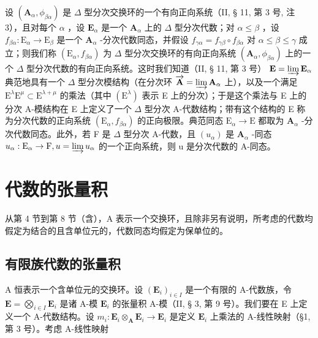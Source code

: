 设 \((\mathbf{A}_{\alpha},\phi_{\beta \alpha})\) 是 \(\Delta\) 型分次交换环的一个有向正向系统（II, § 11, 第 3 号, 注 3），且对每个 \(\alpha\) ，设 \(\mathbf{E}_{\alpha}\) 是一个 \(\mathbf{A}_{\alpha}\) 上的 \(\Delta\) 型分次代数；对 \(\alpha \leqslant \beta\) ，设 \(f_{\beta \alpha}:\mathrm{E}_{\alpha}\to \mathrm{E}_{\beta}\) 是一个 \(\mathbf{A}_{\alpha}\) -分次代数同态，并假设 \(f_{\gamma \alpha} = f_{\gamma \beta}\circ f_{\beta \alpha}\) 对 \(\alpha \leqslant \beta \leqslant \gamma\) 成立；则我们称 \((\mathrm{E}_{\alpha},f_{\beta \alpha})\) 为 \(\Delta\) 型分次交换环的有向正向系统 \((\mathbf{A}_{\alpha},\phi_{\beta \alpha})\) 上的一个 \(\Delta\) 型分次代数的有向正向系统。这时我们知道（II, § 11, 第 3 号） \(\mathbf{E} = \varinjlim \mathbf{E}_{\alpha}\) 典范地具有一个 \(\Delta\) 型分次模结构（在分次环 \(\overrightarrow{\mathbf{A}} = \varinjlim \mathbf{A}_{\alpha}\) 上），以及一个满足 \(\mathrm{E}^{\lambda}\mathrm{E}^{\mu}\subset \mathrm{E}^{\lambda +\mu}\) 的乘法（其中 \((\mathrm{E}^{\lambda})\) 表示 E 上的分次）；于是这个乘法与 E 上的分次 A-模结构在 E 上定义了一个 \(\Delta\) 型分次 A-代数结构；带有这个结构的 E 称为分次代数的正向系统 \((\mathrm{E}_{\alpha},f_{\beta \alpha})\) 的正向极限。典范同态 \(\mathrm{E}_{\alpha}\rightarrow \mathrm{E}\) 都取为 \(\mathbf{A}_{\alpha}\) -分次代数同态。此外，若 F 是 \(\Delta\) 型分次 A-代数，且 \((u_{\alpha})\) 是 \(\mathbf{A}_{\alpha}\) -同态 \(u_{\alpha}:\mathrm{E}_{\alpha}\rightarrow \mathrm{F}, u = \varinjlim u_{\alpha}\) 的一个正向系统，则 u 是分次代数的 A-同态。

\section{代数的张量积}

从第 4 节到第 8 节（含），A 表示一个交换环，且除非另有说明，所考虑的代数均假定为结合的且含单位元的，代数同态均假定为保单位的。

\subsection{有限族代数的张量积}

A 恒表示一个含单位元的交换环。设 \((\mathbf{E}_i)_{i\in I}\) 是一个有限的 A-代数族，令 \(\mathbf{E} = \bigotimes_{i\in I}\mathbf{E}_i\) 是诸 A-模 \(\mathbf{E}_i\) 的张量积 A-模（II, § 3, 第 9 号）。我们要在 E 上定义一个 A-代数结构。设 \(m_i\colon \mathbf{E}_i\otimes_\mathbf{A}\mathbf{E}_i\to \mathbf{E}_i\) 是定义 \(\mathbf{E}_i\) 上乘法的 A-线性映射（§1, 第 3 号）。考虑 A-线性映射

